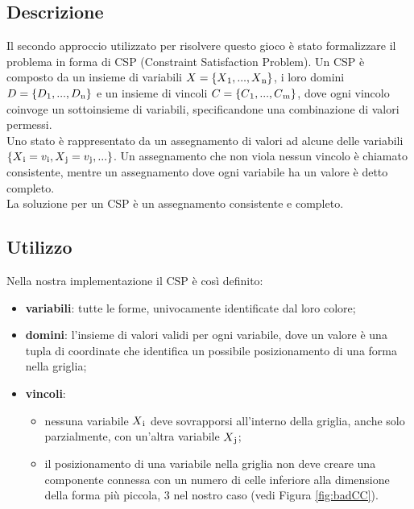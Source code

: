\subsection{Descrizione}
Il secondo approccio utilizzato per risolvere questo gioco è stato formalizzare il problema in forma di CSP (Constraint Satisfaction Problem). Un CSP è composto da un insieme di variabili $X = \{X\textsubscript{1},...,X\textsubscript{n}\}$, i loro domini  $D = \{D\textsubscript{1},...,D\textsubscript{n}\}$ e un insieme di vincoli  $C = \{C\textsubscript{1},...,C\textsubscript{m}\}$, dove ogni vincolo coinvoge un sottoinsieme di variabili, specificandone una combinazione di valori permessi.\\
Uno stato è rappresentato da un assegnamento di valori ad alcune delle variabili $\{X\textsubscript{i} = v\textsubscript{i}, X\textsubscript{j} = v\textsubscript{j},...\}$.
Un assegnamento che non viola nessun vincolo è chiamato consistente, mentre un assegnamento dove ogni variabile ha un valore è detto completo. \\
La soluzione per un CSP è un assegnamento consistente e completo.

\subsection{Utilizzo}
Nella nostra implementazione il CSP è così definito:
\begin{itemize}
	\item \textbf{variabili}: tutte le forme, univocamente identificate dal loro colore;
	\item \textbf{domini}: l'insieme di valori validi per ogni variabile, dove un valore è una tupla di coordinate che identifica un possibile posizionamento di una forma nella griglia;
	\item \textbf{vincoli}: 
		\begin{itemize}
			\item nessuna variabile $X\textsubscript{i}$ deve sovrapporsi all'interno della griglia, anche solo parzialmente, con un'altra variabile $X\textsubscript{j}$;
			\item il posizionamento di una variabile nella griglia non deve creare una componente connessa con un numero di celle inferiore alla dimensione della forma più piccola, 3 nel nostro caso (vedi Figura \ref{fig:badCC}).
		\end{itemize}
\end{itemize}


